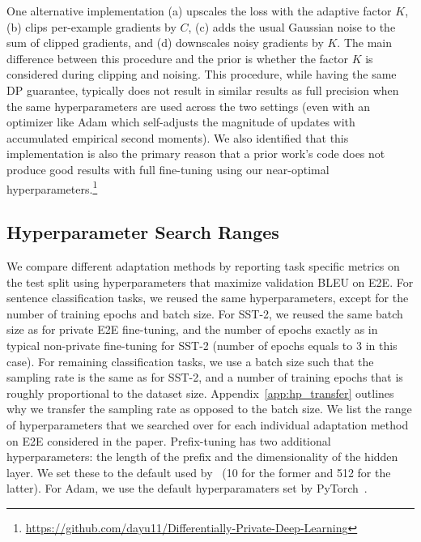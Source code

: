 One alternative implementation (a) upscales the loss with the adaptive factor $K$, (b) clips per-example gradients by $C$, (c) adds the usual Gaussian noise to the sum of clipped gradients, and (d) downscales noisy gradients by $K$. 
The main difference between this procedure and the prior is whether the factor $K$ is considered during clipping and noising.
This procedure, while having the same DP guarantee, typically does not result in similar results as full precision when the same hyperparameters are used across the two settings (even with an optimizer like Adam which self-adjusts the magnitude of updates with accumulated empirical second moments).
We also identified that this implementation is also the primary reason that a prior work's code does not produce good results with full fine-tuning using our near-optimal hyperparameters.\footnote{
    \url{https://github.com/dayu11/Differentially-Private-Deep-Learning}
}

\newpage
\subsection{Hyperparameter Search Ranges}\label{app:hp_search_range}
We compare different adaptation methods by reporting task specific metrics on the test split using hyperparameters that maximize validation BLEU on E2E.
For sentence classification tasks, we reused the same hyperparameters, except for the number of training epochs and batch size.
For SST-2, we reused the same batch size as for private E2E fine-tuning, and the number of epochs exactly as in typical non-private fine-tuning for SST-2 (number of epochs equals to 3 in this case).
For remaining classification tasks, we use a batch size such that the sampling rate is the same as for SST-2, and a number of training epochs that is roughly proportional to the dataset size.
Appendix~\ref{app:hp_transfer} outlines why we transfer the sampling rate as opposed to the batch size.
We list the range of hyperparameters that we searched over for each individual adaptation method on E2E considered in the paper. 
Prefix-tuning has two additional hyperparameters: the length of the prefix and the dimensionality of the hidden layer. 
We set these to the default used by~\cite{li2021prefix} (10 for the former and 512 for the latter).
For Adam, we use the default hyperparamaters set by PyTorch~\citep{paszke2017automatic}. 

